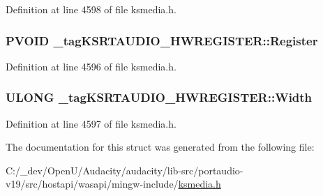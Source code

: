 Definition at line 4598 of file ksmedia.\+h.

\subsubsection[{\texorpdfstring{Register}{Register}}]{\setlength{\rightskip}{0pt plus 5cm}P\+V\+O\+ID \+\_\+tag\+K\+S\+R\+T\+A\+U\+D\+I\+O\+\_\+\+H\+W\+R\+E\+G\+I\+S\+T\+E\+R\+::\+Register}\hypertarget{struct__tag_k_s_r_t_a_u_d_i_o___h_w_r_e_g_i_s_t_e_r_aedadadf95f257c1804bbf7d21d66a22e}{}\label{struct__tag_k_s_r_t_a_u_d_i_o___h_w_r_e_g_i_s_t_e_r_aedadadf95f257c1804bbf7d21d66a22e}


Definition at line 4596 of file ksmedia.\+h.

\subsubsection[{\texorpdfstring{Width}{Width}}]{\setlength{\rightskip}{0pt plus 5cm}U\+L\+O\+NG \+\_\+tag\+K\+S\+R\+T\+A\+U\+D\+I\+O\+\_\+\+H\+W\+R\+E\+G\+I\+S\+T\+E\+R\+::\+Width}\hypertarget{struct__tag_k_s_r_t_a_u_d_i_o___h_w_r_e_g_i_s_t_e_r_a8aac8b12c07467c7733c881f403de474}{}\label{struct__tag_k_s_r_t_a_u_d_i_o___h_w_r_e_g_i_s_t_e_r_a8aac8b12c07467c7733c881f403de474}


Definition at line 4597 of file ksmedia.\+h.



The documentation for this struct was generated from the following file\+:\begin{DoxyCompactItemize}
\item 
C\+:/\+\_\+dev/\+Open\+U/\+Audacity/audacity/lib-\/src/portaudio-\/v19/src/hostapi/wasapi/mingw-\/include/\hyperlink{ksmedia_8h}{ksmedia.\+h}\end{DoxyCompactItemize}
